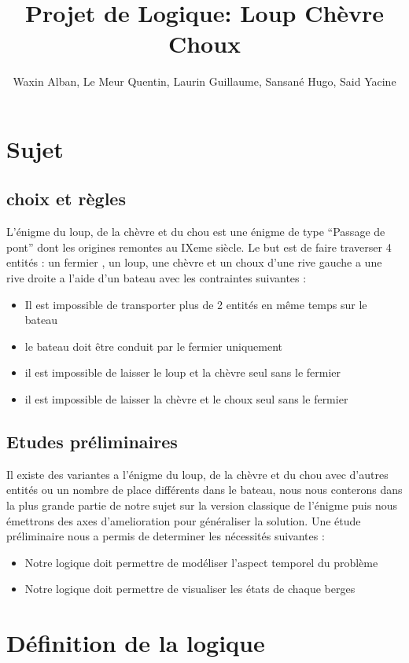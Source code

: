 \documentclass{article}
\title{Projet de Logique: Loup Chèvre Choux}
\author{Waxin Alban, Le Meur Quentin, Laurin Guillaume, Sansané Hugo, Said Yacine}
\begin{document}
\maketitle\newpage
\section{Sujet}
\subsection{choix et règles}
L’énigme du loup, de la chèvre et du chou est une énigme de type “Passage de pont” dont les origines remontes au IXeme siècle.
Le but est de faire traverser 4 entités : un fermier , un loup, une chèvre et un choux d’une rive gauche a une rive droite a l’aide d’un bateau avec les contraintes suivantes :

\begin{itemize}
  \item  Il est impossible de transporter plus de 2 entités en même temps sur le bateau
  \item  le bateau doit être conduit par le fermier uniquement
  \item  il est impossible de laisser le loup et la chèvre seul sans le fermier
  \item  il est impossible de laisser la chèvre et le choux seul sans le fermier
\end{itemize}

\subsection{Etudes préliminaires}
Il existe des variantes a l’énigme du loup, de la chèvre et du chou avec d’autres entités ou un nombre de place différents dans le bateau, nous nous conterons dans la plus grande partie de notre sujet sur la version classique de l’énigme puis nous émettrons des axes d’amelioration pour généraliser la solution.
Une étude préliminaire nous a permis de determiner les nécessités suivantes :
\begin{itemize}
  \item Notre logique doit permettre de modéliser l’aspect temporel du problème
  \item Notre logique doit permettre de visualiser les états de chaque berges
\end{itemize}

\section{Définition de la logique}
\end{document}
